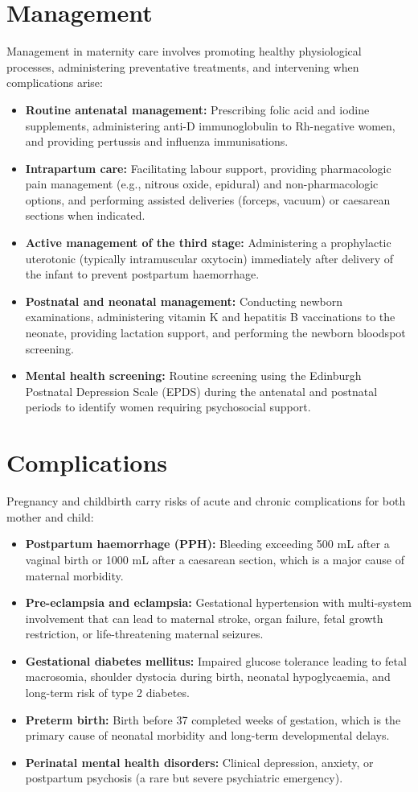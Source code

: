 \section*{Management}
Management in maternity care involves promoting healthy physiological processes, administering preventative treatments, and intervening when complications arise:
\begin{itemize}
    \item \textbf{Routine antenatal management:} Prescribing folic acid and iodine supplements, administering anti-D immunoglobulin to Rh-negative women, and providing pertussis and influenza immunisations.
    \item \textbf{Intrapartum care:} Facilitating labour support, providing pharmacologic pain management (e.g., nitrous oxide, epidural) and non-pharmacologic options, and performing assisted deliveries (forceps, vacuum) or caesarean sections when indicated.
    \item \textbf{Active management of the third stage:} Administering a prophylactic uterotonic (typically intramuscular oxytocin) immediately after delivery of the infant to prevent postpartum haemorrhage.
    \item \textbf{Postnatal and neonatal management:} Conducting newborn examinations, administering vitamin K and hepatitis B vaccinations to the neonate, providing lactation support, and performing the newborn bloodspot screening.
    \item \textbf{Mental health screening:} Routine screening using the Edinburgh Postnatal Depression Scale (EPDS) during the antenatal and postnatal periods to identify women requiring psychosocial support.
\end{itemize}

\section*{Complications}
Pregnancy and childbirth carry risks of acute and chronic complications for both mother and child:
\begin{itemize}
    \item \textbf{Postpartum haemorrhage (PPH):} Bleeding exceeding 500 mL after a vaginal birth or 1000 mL after a caesarean section, which is a major cause of maternal morbidity.
    \item \textbf{Pre-eclampsia and eclampsia:} Gestational hypertension with multi-system involvement that can lead to maternal stroke, organ failure, fetal growth restriction, or life-threatening maternal seizures.
    \item \textbf{Gestational diabetes mellitus:} Impaired glucose tolerance leading to fetal macrosomia, shoulder dystocia during birth, neonatal hypoglycaemia, and long-term risk of type 2 diabetes.
    \item \textbf{Preterm birth:} Birth before 37 completed weeks of gestation, which is the primary cause of neonatal morbidity and long-term developmental delays.
    \item \textbf{Perinatal mental health disorders:} Clinical depression, anxiety, or postpartum psychosis (a rare but severe psychiatric emergency).
\end{itemize}

